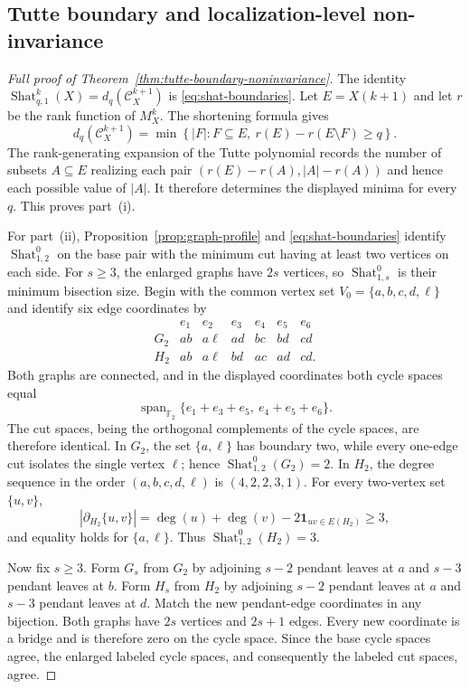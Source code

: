 \documentclass[11pt,letterpaper]{article}
\theoremstyle{plain}
\theoremstyle{definition}
\newcommand{\F}{\mathbb{F}_2}
\newcommand{\cC}{\mathcal{C}}
\newcommand{\Shat}{\operatorname{Shat}}
\newcommand{\1}{\mathbf{1}}
\newcommand{\abs}[1]{\left|#1\right|}
\newcommand{\set}[1]{\left\{#1\right\}}
\begin{document}
\subsection{Tutte boundary and localization-level non-invariance}
\label{app:noninvariance-proof}

\begin{proof}[Full proof of Theorem~\ref{thm:tutte-boundary-noninvariance}]
The identity $\Shat_{q,1}^k(X)=d_q(\cC_X^{k+1})$ is
\eqref{eq:shat-boundaries}.  Let $E=X(k+1)$ and let $r$ be the rank function of
$M_X^k$.  The shortening formula gives
\[
 d_q(\cC_X^{k+1})=
 \min\set{\abs F:F\subseteq E,\ r(E)-r(E\setminus F)\ge q}.
\]
The rank-generating expansion of the Tutte polynomial records the number of subsets
$A\subseteq E$ realizing each pair $(r(E)-r(A),\abs A-r(A))$ and hence each possible
value of $\abs A$.  It therefore determines
the displayed minima for every $q$.  This proves part~(i).

For part~(ii), Proposition~\ref{prop:graph-profile} and
\eqref{eq:shat-boundaries} identify $\Shat_{1,2}^0$ on the base pair with the
minimum cut having at least two vertices on each side.  For $s\ge3$, the enlarged
graphs have $2s$ vertices, so $\Shat_{1,s}^0$ is their minimum bisection size.  Begin
with the common vertex set
$V_0=\{a,b,c,d,\ell\}$ and identify six edge coordinates by
\begin{equation}\label{eq:base-graph-pair}
\begin{array}{c|cccccc}
 &e_1&e_2&e_3&e_4&e_5&e_6\\ \hline
G_2&ab&a\ell&ad&bc&bd&cd\\
H_2&ab&a\ell&bd&ac&ad&cd.
\end{array}
\end{equation}
Both graphs are connected, and in the displayed coordinates both cycle spaces equal
\[
 \operatorname{span}_{\F}
 \{e_1+e_3+e_5,\ e_4+e_5+e_6\}.
\]
The cut spaces, being the orthogonal complements of the cycle spaces, are therefore
identical.  In $G_2$, the set $\{a,\ell\}$ has boundary two, while every one-edge cut
isolates the single vertex $\ell$; hence $\Shat_{1,2}^0(G_2)=2$.  In $H_2$, the degree
sequence in the order $(a,b,c,d,\ell)$ is $(4,2,2,3,1)$.  For every two-vertex set
$\{u,v\}$,
\[
 \abs{\partial_{H_2}\{u,v\}}
 =\deg(u)+\deg(v)-2\mathbf 1_{uv\in E(H_2)}\ge3,
\]
and equality holds for $\{a,\ell\}$.  Thus
$\Shat_{1,2}^0(H_2)=3$.

Now fix $s\ge3$.  Form $G_s$ from $G_2$ by adjoining $s-2$ pendant leaves at $a$ and
$s-3$ pendant leaves at $b$.  Form $H_s$ from $H_2$ by adjoining $s-2$ pendant leaves
at $a$ and $s-3$ pendant leaves at $d$.  Match the new pendant-edge coordinates in any
bijection.  Both graphs have $2s$ vertices and $2s+1$ edges.  Every new coordinate is a
bridge and is therefore zero on the cycle space.  Since the base cycle spaces agree,
the enlarged labeled cycle spaces, and consequently the labeled cut spaces, agree.


\end{proof}
\end{document}
